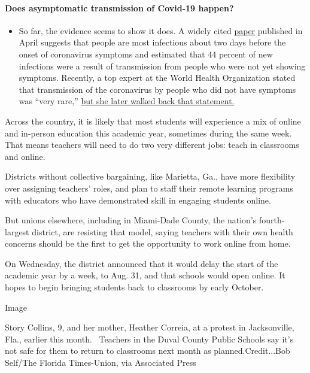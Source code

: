 \begin{itemize}
{  \paragraph{Does asymptomatic transmission of Covid-19
  happen?}\label{does-asymptomatic-transmission-of-covid-19-happen}}

  \begin{itemize}
  \tightlist
  \item
    So far, the evidence seems to show it does. A widely cited
    \href{https://www.nature.com/articles/s41591-020-0869-5}{paper}
    published in April suggests that people are most infectious about
    two days before the onset of coronavirus symptoms and estimated that
    44 percent of new infections were a result of transmission from
    people who were not yet showing symptoms. Recently, a top expert at
    the World Health Organization stated that transmission of the
    coronavirus by people who did not have symptoms was ``very rare,''
    \href{https://www.nytimes.com/2020/06/09/world/coronavirus-updates.html?action=click\&pgtype=Article\&state=default\&region=MAIN_CONTENT_3\&context=storylines_faq\#link-1f302e21}{but
    she later walked back that statement.}
  \end{itemize}
\end{itemize}

Across the country, it is likely that most students will experience a
mix of online and in-person education this academic year, sometimes
during the same week. That means teachers will need to do two very
different jobs: teach in classrooms and online.

Districts without collective bargaining, like Marietta, Ga., have more
flexibility over assigning teachers' roles, and plan to staff their
remote learning programs with educators who have demonstrated skill in
engaging students online.

But unions elsewhere, including in Miami-Dade County, the nation's
fourth-largest district, are resisting that model, saying teachers with
their own health concerns should be the first to get the opportunity to
work online from home.

On Wednesday, the district announced that it would delay the start of
the academic year by a week, to Aug. 31, and that schools would open
online. It hopes to begin bringing students back to classrooms by early
October.

Image

Story Collins, 9, and her mother, Heather Correia, at a protest in
Jacksonville, Fla., earlier this month.~ Teachers in the Duval County
Public Schools say it's not safe for them to return to classrooms next
month as planned.Credit...Bob Self/The Florida Times-Union, via
Associated Press

